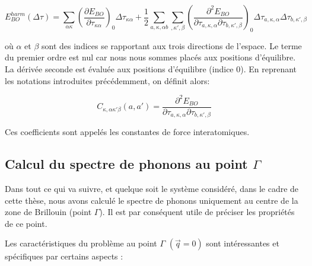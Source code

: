 \documentclass[12pt,a4paper]{book}
\begin{document}
\begin{equation}
E_{BO}^{harm}(\Delta\tau) = \sum_{\alpha\kappa} \left(\frac{\partial E_{BO}}{\partial\tau_{\kappa\alpha}}\right)_{0} \Delta\tau_{\kappa\alpha} + \frac{1}{2} \sum_{a,\kappa,\alpha b} \sum_{,\kappa',\beta} \left(\frac{\partial^{2}E_{BO}}{\partial\tau_{a,\kappa,\alpha}\partial\tau_{b,\kappa',\beta}}\right)_{0} \Delta\tau_{a,\kappa,\alpha}\Delta\tau_{b,\kappa',\beta}
\end{equation}

où $\alpha$ et $\beta$ sont des indices se rapportant aux trois directions de l'espace. Le terme du premier ordre est nul car nous nous sommes placés aux positions d'équilibre. La dérivée seconde est évaluée aux positions d'équilibre (indice 0). En reprenant les notations introduites précédemment, on définit alors: 

\begin{equation}
C_{\kappa,\alpha\kappa'\beta}(a,a') = \frac{\partial^{2}E_{BO}}{\partial\tau_{a,\kappa,\alpha}\partial\tau_{b,\kappa',\beta}}
\end{equation}

Ces coefficients sont appelés les constantes de force interatomiques. 

\subsection{Calcul du spectre de phonons au point $\Gamma$}

Dans tout ce qui va suivre, et quelque soit le système considéré, dans le cadre de cette thèse, nous avons calculé le spectre de phonons uniquement au centre de la zone de Brillouin (point $\Gamma$). Il est par conséquent utile de préciser les propriétés de ce point. 


Les caractéristiques du problème au point $\Gamma$ $(\overrightarrow{q}= 0)$ sont intéressantes et spécifiques par certains aspects :
\end{document}
